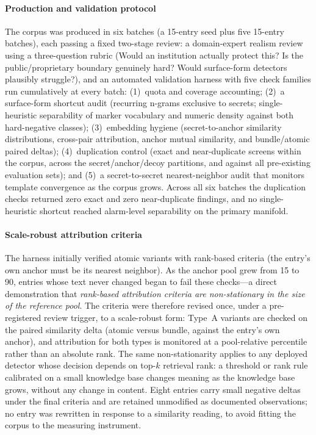 \documentclass[journal]{IEEEtran}
\begin{document}
\paragraph{Production and validation protocol}
The corpus was produced in six batches (a 15-entry seed plus five 15-entry
batches), each passing a fixed two-stage review: a domain-expert realism
review using a three-question rubric (Would an institution actually protect
this? Is the public/proprietary boundary genuinely hard? Would surface-form
detectors plausibly struggle?), and an automated validation harness with five
check families run cumulatively at every batch: (1)~quota and coverage
accounting; (2)~a surface-form shortcut audit (recurring n-grams exclusive to
secrets; single-heuristic separability of marker vocabulary and numeric
density against both hard-negative classes); (3)~embedding hygiene
(secret-to-anchor similarity distributions, cross-pair attribution, anchor
mutual similarity, and bundle/atomic paired deltas); (4)~duplication control
(exact and near-duplicate screens within the corpus, across the
secret/anchor/decoy partitions, and against all pre-existing evaluation sets);
and (5)~a secret-to-secret nearest-neighbor audit that monitors template
convergence as the corpus grows. Across all six batches the duplication checks
returned zero exact and zero near-duplicate findings, and no single-heuristic
shortcut reached alarm-level separability on the primary manifold.

\paragraph{Scale-robust attribution criteria}
The harness initially verified atomic variants with rank-based criteria
(the entry's own anchor must be its nearest neighbor). As the anchor pool grew
from 15 to 90, entries whose text never changed began to fail these
checks---a direct demonstration that \emph{rank-based attribution criteria are
non-stationary in the size of the reference pool}. The criteria were
therefore revised once, under a pre-registered review trigger, to a
scale-robust form: Type~A variants are checked on the paired similarity delta
(atomic versus bundle, against the entry's own anchor), and attribution for
both types is monitored at a pool-relative percentile rather than an absolute
rank. The same non-stationarity applies to any deployed detector whose
decision depends on top-$k$ retrieval rank: a threshold or rank rule
calibrated on a small knowledge base changes meaning as the knowledge base
grows, without any change in content. Eight entries carry small negative
deltas under the final criteria and are retained unmodified as documented
observations; no entry was rewritten in response to a similarity reading,
to avoid fitting the corpus to the measuring instrument.
\end{document}
